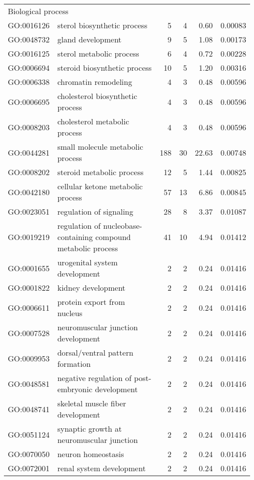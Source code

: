 \begin{longtable}{lp{4.5cm}rrrl}
   \hline
   \multicolumn{6}{l}{Biological process}  \\ 
GO:0016126 & sterol biosynthetic process &   5 &   4 & 0.60 & 0.00083 \\ 
  GO:0048732 & gland development &   9 &   5 & 1.08 & 0.00173 \\ 
  GO:0016125 & sterol metabolic process &   6 &   4 & 0.72 & 0.00228 \\ 
  GO:0006694 & steroid biosynthetic process &  10 &   5 & 1.20 & 0.00316 \\ 
  GO:0006338 & chromatin remodeling &   4 &   3 & 0.48 & 0.00596 \\ 
  GO:0006695 & cholesterol biosynthetic process &   4 &   3 & 0.48 & 0.00596 \\ 
  GO:0008203 & cholesterol metabolic process &   4 &   3 & 0.48 & 0.00596 \\ 
  GO:0044281 & small molecule metabolic process & 188 &  30 & 22.63 & 0.00748 \\ 
  GO:0008202 & steroid metabolic process &  12 &   5 & 1.44 & 0.00825 \\ 
  GO:0042180 & cellular ketone metabolic process &  57 &  13 & 6.86 & 0.00845 \\ 
  GO:0023051 & regulation of signaling &  28 &   8 & 3.37 & 0.01087 \\ 
  GO:0019219 & regulation of nucleobase-containing compound metabolic process &  41 &  10 & 4.94 & 0.01412 \\ 
  GO:0001655 & urogenital system development &   2 &   2 & 0.24 & 0.01416 \\ 
  GO:0001822 & kidney development &   2 &   2 & 0.24 & 0.01416 \\ 
  GO:0006611 & protein export from nucleus &   2 &   2 & 0.24 & 0.01416 \\ 
  GO:0007528 & neuromuscular junction development &   2 &   2 & 0.24 & 0.01416 \\ 
  GO:0009953 & dorsal/ventral pattern formation &   2 &   2 & 0.24 & 0.01416 \\ 
  GO:0048581 & negative regulation of post-embryonic development &   2 &   2 & 0.24 & 0.01416 \\ 
  GO:0048741 & skeletal muscle fiber development &   2 &   2 & 0.24 & 0.01416 \\ 
  GO:0051124 & synaptic growth at neuromuscular junction &   2 &   2 & 0.24 & 0.01416 \\ 
  GO:0070050 & neuron homeostasis &   2 &   2 & 0.24 & 0.01416 \\ 
  GO:0072001 & renal system development &   2 &   2 & 0.24 & 0.01416 \\ 

\end{longtable}
